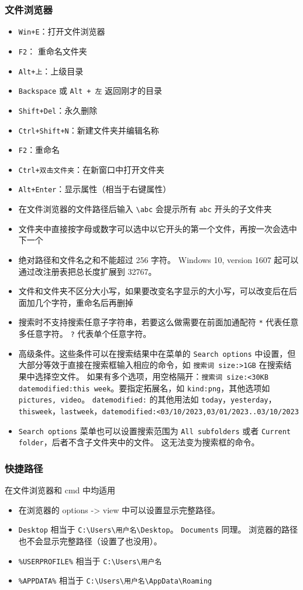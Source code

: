 \subsubsection{文件浏览器}
\begin{itemize}
\item \verb`Win+E`：打开文件浏览器
\item \verb`F2`： 重命名文件夹
\item \verb`Alt+上`：上级目录
\item \verb`Backspace` 或 \verb`Alt + 左` 返回刚才的目录
\item \verb`Shift+Del`：永久删除
\item \verb`Ctrl+Shift+N`：新建文件夹并编辑名称
\item \verb`F2`：重命名
\item \verb`Ctrl+双击文件夹`：在新窗口中打开文件夹
\item \verb`Alt+Enter`：显示属性（相当于右键属性）
\item 在文件浏览器的文件路径后输入 \verb`\abc` 会提示所有 \verb`abc` 开头的子文件夹
\item 文件夹中直接按字母或数字可以选中以它开头的第一个文件，再按一次会选中下一个
\item 绝对路径和文件名之和不能超过 256 字符。 Windows 10, version 1607 起可以通过改注册表把总长度扩展到 32767。
\item 文件和文件夹不区分大小写，如果要改变名字显示的大小写，可以改变后在后面加几个字符，重命名后再删掉
\item 搜索时不支持搜索任意子字符串，若要这么做需要在前面加通配符 \verb`*` 代表任意多任意字符。 \verb`?` 代表单个任意字符。
\item 高级条件。这些条件可以在搜索结果中在菜单的 \verb`Search options` 中设置，但大部分等效于直接在搜索框输入相应的命令，如 \verb`搜索词 size:>1GB` 在搜索结果中选择空文件。 如果有多个选项，用空格隔开：\verb`搜索词 size:<30KB datemodified:this week`。要指定拓展名，如 \verb`kind:png`，其他选项如 \verb`pictures, video`。 \verb`datemodified:` 的其他用法如 \verb`today`，\verb`yesterday`，\verb`thisweek`，\verb`lastweek`，\verb`datemodified:<03/10/2023,03/01/2023..03/10/2023`
\item \verb`Search options` 菜单也可以设置搜索范围为 \verb`All subfolders` 或者 \verb`Current folder`，后者不含子文件夹中的文件。 这无法变为搜索框的命令。
\end{itemize}

\subsubsection{快捷路径}
在文件浏览器和 cmd 中均适用
\begin{itemize}
\item 在浏览器的 options -> view 中可以设置显示完整路径。
\item \verb`Desktop` 相当于 \verb`C:\Users\用户名\Desktop`。 \verb`Documents` 同理。 浏览器的路径也不会显示完整路径（设置了也没用）。
\item \verb`%USERPROFILE%` 相当于 \verb`C:\Users\用户名`
\item \verb`%APPDATA%` 相当于 \verb`C:\Users\用户名\AppData\Roaming`
\end{itemize}

